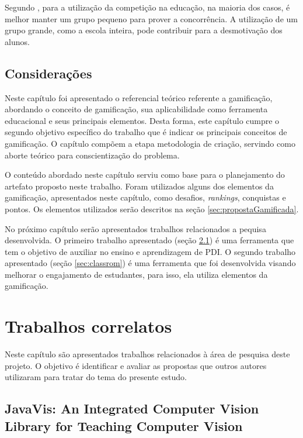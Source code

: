 \documentclass[
	12pt,				%
	oneside,			%
	a4paper,			%
	english,			%
	french,				%
	spanish,			%
	brazil,				%
	]{abntex2}
\begin{document}
Segundo \citet{andre2018}, para a utilização da competição na educação, na maioria dos casos, é melhor manter um grupo pequeno para prover a concorrência. A utilização de um grupo grande, como a escola inteira, pode contribuir para a desmotivação dos alunos.

\section{Considerações}

Neste capítulo foi apresentado o referencial teórico referente a gamificação, abordando o conceito de gamificação, sua aplicabilidade como ferramenta educacional e seus principais elementos. Desta forma, este capítulo cumpre o segundo objetivo específico do trabalho que é indicar os principais conceitos de gamificação. O capítulo compõem a etapa metodologia de criação, servindo como aborte teórico para conscientização do problema.

O conteúdo abordado neste capítulo serviu como base para o planejamento do artefato proposto neste trabalho. Foram utilizados alguns dos elementos da gamificação, apresentados neste capítulo, como desafios, \textit{rankings}, conquistas e pontos. Os elementos utilizados serão descritos na seção \ref{sec:propostaGamificada}.

No próximo capítulo serão apresentados trabalhos relacionados a pequisa desenvolvida. O primeiro trabalho apresentado (seção \ref{sec:javavis}) é uma ferramenta que tem o objetivo de auxiliar no ensino e aprendizagem de PDI. O segundo trabalho apresentado (seção \ref{sec:classrom}) é uma ferramenta que foi desenvolvida visando melhorar o engajamento de estudantes, para isso, ela utiliza elementos da gamificação.

\chapter{Trabalhos correlatos}
\label{sec:trabalhosCorrelatos}

Neste capítulo são apresentados trabalhos relacionados à área de pesquisa deste projeto. O objetivo é identificar e avaliar as propostas que outros autores utilizaram para tratar do tema do presente estudo.

\section{JavaVis: An Integrated Computer Vision Library for Teaching Computer Vision}
\label{sec:javavis}
\end{document}

